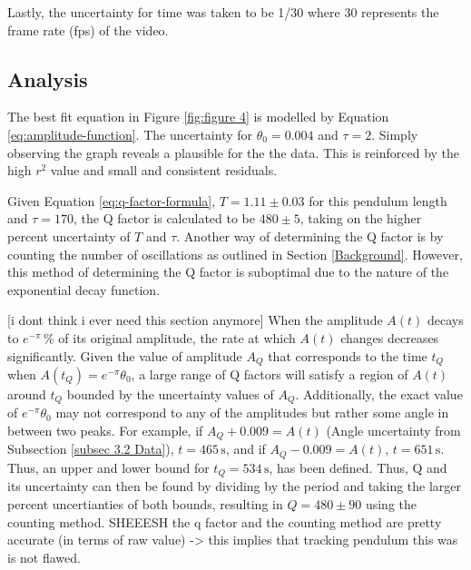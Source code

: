 \documentclass[12pt]{article}
\begin{document}
Lastly, the uncertainty for time was taken to be {\color{blue}1/30} where {\color{blue}30} represents the frame rate (fps) of the video.


\subsection{Analysis}
{\color{blue}
The best fit equation in Figure \ref{fig:figure 4} is modelled by Equation \ref{eq:amplitude-function}. The uncertainty for $\theta_0 = 0.004$ and $\tau = 2$. Simply observing the graph reveals a plausible for the the data. This is reinforced by the high $r^2$ value and small and consistent residuals.

Given Equation \ref{eq:q-factor-formula}, $T = 1.11 \pm 0.03$ for this pendulum length and $\tau = 170$, the Q factor is calculated to be $480 \pm 5$, taking on the higher percent uncertainty of $T$ and $\tau$.
Another way of determining the Q factor is by counting the number of oscillations as outlined in Section \ref{Background}. However, this method of determining the Q factor is suboptimal due to the nature of the exponential decay function.

[i dont think i ever need this section anymore] When the amplitude $A(t)$ decays to $e^{-\pi}\,\%$ of its original amplitude, the rate at which $A(t)$ changes decreases significantly. Given the value of amplitude $A_Q$ that corresponds to the time $t_Q$ when $A(t_Q) = e^{-\pi}\theta_0$, a large range of Q factors will satisfy a region of $A(t)$ around $t_Q$ bounded by the uncertainty values of $A_Q$. Additionally, the exact value of $e^{-\pi}\theta_0$ may  not correspond to any of the amplitudes but rather some angle in between two peaks. For example, if $A_Q + 0.009 = A(t)$ (Angle uncertainty from Subsection \ref{subsec 3.2 Data}), $t = 465\,\text{s}$, and if $A_Q - 0.009 = A(t)$, $t = 651\,\text{s}$. Thus, an upper and lower bound for $t_Q = 534\,\text{s}$, has been defined. Thus, Q and its uncertainty can then be found by dividing by the period and taking the larger percent uncertianties of both bounds, resulting in $Q = 480 \pm 90$ using the counting method.
SHEEESH the q factor and the counting method are pretty accurate (in terms of raw value) -> this implies that tracking pendulum this was is not flawed.
}

\end{document}
